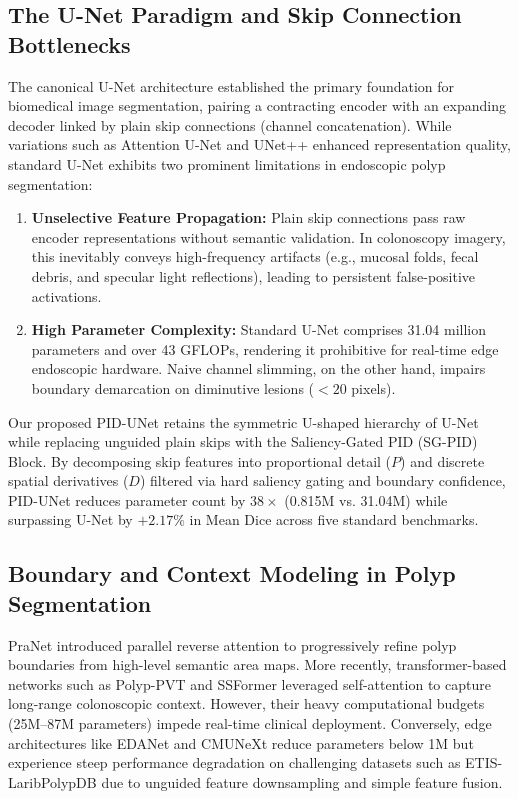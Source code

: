 \documentclass[conference]{IEEEtran}
\begin{document}
\subsection{The U-Net Paradigm and Skip Connection Bottlenecks}
The canonical U-Net architecture \cite{ronneberger2015u} established the primary foundation for biomedical image segmentation, pairing a contracting encoder with an expanding decoder linked by plain skip connections (channel concatenation). While variations such as Attention U-Net \cite{oktay2018attention} and UNet++ \cite{zhou2018unetplusplus} enhanced representation quality, standard U-Net exhibits two prominent limitations in endoscopic polyp segmentation:
\begin{enumerate}
    \item \textbf{Unselective Feature Propagation:} Plain skip connections pass raw encoder representations without semantic validation. In colonoscopy imagery, this inevitably conveys high-frequency artifacts (e.g., mucosal folds, fecal debris, and specular light reflections), leading to persistent false-positive activations.
    \item \textbf{High Parameter Complexity:} Standard U-Net comprises 31.04 million parameters and over 43 GFLOPs, rendering it prohibitive for real-time edge endoscopic hardware. Naive channel slimming, on the other hand, impairs boundary demarcation on diminutive lesions ($<20$ pixels).
\end{enumerate}
Our proposed PID-UNet retains the symmetric U-shaped hierarchy of U-Net while replacing unguided plain skips with the Saliency-Gated PID (SG-PID) Block. By decomposing skip features into proportional detail ($P$) and discrete spatial derivatives ($D$) filtered via hard saliency gating and boundary confidence, PID-UNet reduces parameter count by $38\times$ (0.815M vs. 31.04M) while surpassing U-Net by $+2.17\%$ in Mean Dice across five standard benchmarks.

\subsection{Boundary and Context Modeling in Polyp Segmentation}
PraNet \cite{fan2020pranet} introduced parallel reverse attention to progressively refine polyp boundaries from high-level semantic area maps. More recently, transformer-based networks such as Polyp-PVT \cite{dong2021polyp} and SSFormer \cite{wang2022stepwise} leveraged self-attention to capture long-range colonoscopic context. However, their heavy computational budgets (25M--87M parameters) impede real-time clinical deployment. Conversely, edge architectures like EDANet \cite{lo2019efficient} and CMUNeXt \cite{tang2023cmunext} reduce parameters below 1M but experience steep performance degradation on challenging datasets such as ETIS-LaribPolypDB due to unguided feature downsampling and simple feature fusion.
\end{document}
